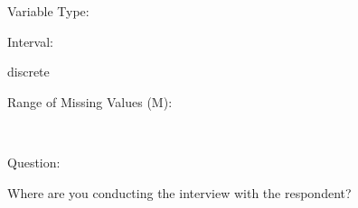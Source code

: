 \documentclass[
]{article}
\begin{document}
\begin{minipage}[t]{0.3\linewidth}

Variable Type:

\end{minipage}%
\begin{minipage}[t]{0.7\linewidth}

\end{minipage}

\begin{minipage}[t]{0.3\linewidth}

Interval:

\end{minipage}%
\begin{minipage}[t]{0.7\linewidth}

discrete

\end{minipage}

\begin{minipage}[t]{0.3\linewidth}

Range of Missing Values (M):

\end{minipage}%
\begin{minipage}[t]{0.7\linewidth}

~

\end{minipage}

\begin{minipage}[t]{0.3\linewidth}

Question:

\end{minipage}%
\begin{minipage}[t]{0.7\linewidth}

Where are you conducting the interview with the respondent?

\end{minipage}
\end{document}
